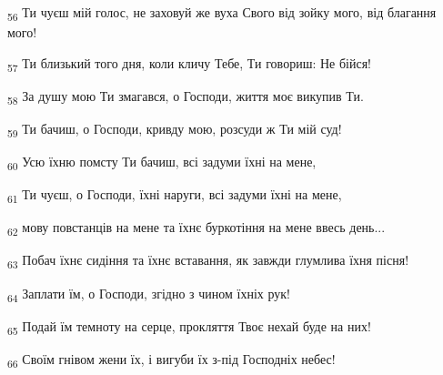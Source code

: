 \begin{tcolorbox}
\textsubscript{56} Ти чуєш мій голос, не заховуй же вуха Свого від зойку мого, від благання мого!
\end{tcolorbox}
\begin{tcolorbox}
\textsubscript{57} Ти близький того дня, коли кличу Тебе, Ти говориш: Не бійся!
\end{tcolorbox}
\begin{tcolorbox}
\textsubscript{58} За душу мою Ти змагався, о Господи, життя моє викупив Ти.
\end{tcolorbox}
\begin{tcolorbox}
\textsubscript{59} Ти бачиш, о Господи, кривду мою, розсуди ж Ти мій суд!
\end{tcolorbox}
\begin{tcolorbox}
\textsubscript{60} Усю їхню помсту Ти бачиш, всі задуми їхні на мене,
\end{tcolorbox}
\begin{tcolorbox}
\textsubscript{61} Ти чуєш, о Господи, їхні наруги, всі задуми їхні на мене,
\end{tcolorbox}
\begin{tcolorbox}
\textsubscript{62} мову повстанців на мене та їхнє буркотіння на мене ввесь день...
\end{tcolorbox}
\begin{tcolorbox}
\textsubscript{63} Побач їхнє сидіння та їхнє вставання, як завжди глумлива їхня пісня!
\end{tcolorbox}
\begin{tcolorbox}
\textsubscript{64} Заплати їм, о Господи, згідно з чином їхніх рук!
\end{tcolorbox}
\begin{tcolorbox}
\textsubscript{65} Подай їм темноту на серце, прокляття Твоє нехай буде на них!
\end{tcolorbox}
\begin{tcolorbox}
\textsubscript{66} Своїм гнівом жени їх, і вигуби їх з-під Господніх небес!
\end{tcolorbox}
